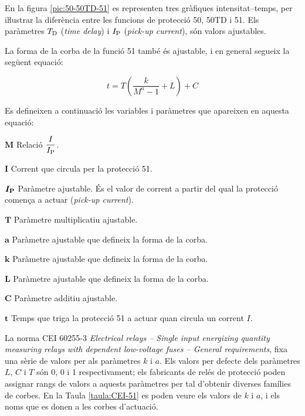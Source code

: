 En la figura \vref{pic:50-50TD-51} es representen tres gràfiques intensitat--temps, per iŀlustrar la diferència entre les funcions de protecció 50, 50TD i 51. Els paràmetres $T_\mathrm{D}$ (\textit{time delay}) i $I_\mathrm{P}$ (\textit{pick-up current}), són valors ajustables.
\begin{center}
    
    \label{pic:50-50TD-51}
\end{center}

La forma de la corba de la funció 51 també és ajustable, i en general segueix la següent equació:

\begin{equation}\label{eq:corba-50-51}
  t = T \left( \frac{k}{M^a -1} + L \right) + C
\end{equation}

Es defineixen a continuació les variables i paràmetres que apareixen en aquesta equació:
\begin{list}{}
   {\setlength{\labelwidth}{10mm} \setlength{\leftmargin}{10mm} \setlength{\labelsep}{2mm}}
        \item[$\boldsymbol{M}$] Relació $\dfrac{I}{I_\mathrm{P}}$.
        \item[$\boldsymbol{I}$] Corrent que circula per la protecció 51.
        \item[$\boldsymbol{I_\mathrm{P}}$] Paràmetre ajustable. És el valor de corrent a partir del qual la  protecció comença a actuar (\textit{pick-up current}).
        \item[$\boldsymbol{T}$] Paràmetre multiplicatiu ajustable.
        \item[$\boldsymbol{a}$] Paràmetre ajustable que defineix la forma de la corba.
        \item[$\boldsymbol{k}$] Paràmetre ajustable que defineix la forma de la corba.
        \item[$\boldsymbol{L}$] Paràmetre ajustable que defineix la forma de la corba.
        \item[$\boldsymbol{C}$] Paràmetre additiu ajustable.
        \item[$\boldsymbol{t}$] Temps que triga la protecció 51 a actuar quan circula un corrent $I$.
\end{list}

La norma CEI 60255-3 \textit{Electrical relays -- Single input energizing quantity measuring relays with dependent low-voltage fuses -- General requirements}, fixa una sèrie de valors per als paràmetres $k$ i $a$. Els valors per defecte dels paràmetres $L$, $C$ i $T$ són 0, 0 i 1 respectivament; els fabricants de relés de protecció poden assignar  rangs de valors a aquests paràmetres per tal d'obtenir diverses famílies de corbes. En la Taula \vref{taula:CEI-51} es poden veure els valors de $k$ i $a$, i els noms que es donen a les corbes d'actuació.

